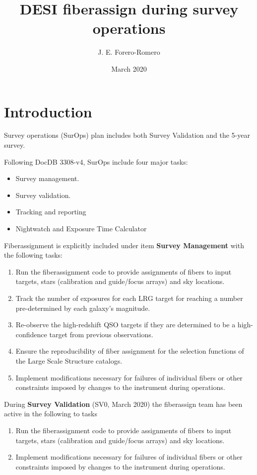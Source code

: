 \documentclass{article}
\title{DESI fiberassign during survey operations}
\author{J. E. Forero-Romero}
\date{March 2020}
\begin{document}
\maketitle

\section{Introduction}


Survey operations (SurOps) plan includes both Survey Validation and the 5-year survey.

Following DocDB 3308-v4, SurOps include four major tasks:
\begin{itemize}
    \item Survey management.
    \item Survey validation.
    \item Tracking and reporting
    \item Nightwatch and Exposure Time Calculator
\end{itemize}

Fiberassignment is explicitly included under item \textbf{Survey Management}
with the following tasks:

\begin{enumerate}
\item Run the fiberassignment code to provide assignments of fibers to
  input targets, stars (calibration and guide/focus arrays) and sky
  locations. 

\item Track the number of exposures for each LRG target for
  reaching a number pre-determined by each galaxy’s magnitude. 

\item Re-observe the high-redshift QSO targets if they are
  determined to be a high-confidence target from previous observations.

\item Ensure the reproducibility of fiber assignment for the
  selection functions of the Large Scale Structure catalogs.

\item Implement modifications necessary for failures of individual
  fibers or other constraints imposed by changes to the instrument
  during operations. 
\end{enumerate}


During \textbf{Survey Validation} (SV0, March 2020) 
the fiberassign team has been active in the following to tasks 

\begin{enumerate}
\item Run the fiberassignment code to provide assignments of fibers to
  input targets, stars (calibration and guide/focus arrays) and sky
  locations. 
\item Implement modifications necessary for failures of individual
  fibers or other constraints imposed by changes to the instrument
  during operations. 
\end{enumerate}
\end{document}
